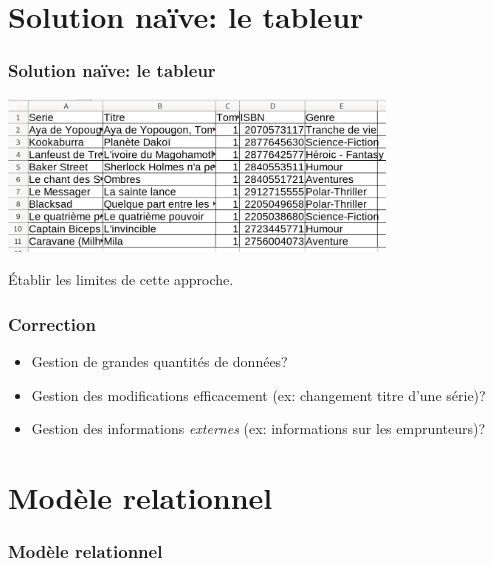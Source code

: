 \documentclass[svgnames,11pt]{beamer}
\begin{document}
\section{Solution naïve: le tableur}
\begin{frame}
    \frametitle{Solution naïve: le tableur}

    \begin{center}
    \centering
    \includegraphics[width=10cm]{ressources/approche-1.png}
    \label{IMG}
    \end{center}
\begin{activite}
    Établir les limites de cette approche.
\end{activite}
\end{frame}
\begin{frame}
    \frametitle{Correction}

    \begin{itemize}
        \item Gestion de grandes quantités de données?
        \item Gestion des modifications efficacement (ex: changement titre d'une série)?
        \item Gestion des informations \emph{externes} (ex: informations sur les emprunteurs)?
    \end{itemize}
\end{frame}
\section{Modèle relationnel}
\begin{frame}
    \frametitle{Modèle relationnel}

    

\end{frame}
\end{document}
